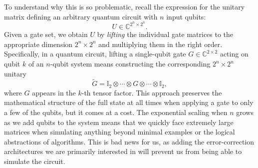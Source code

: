To understand why this is so problematic, recall the expression for the unitary matrix defining an arbitrary quantum circuit with $n$ input qubits:
\[U \in \mathbb{C}^{2^n \times 2^n}.\]
Given a gate set, we obtain $U$ by \emph{lifting} the individual gate matrices to the appropriate dimension $2^n \times 2^n$ and multiplying them in the right order. Specifically, in a quantum circuit, lifting a single-qubit gate $G \in \mathbb{C}^{2 \times 2}$ acting on qubit $k$ of an $n$-qubit system means constructing the corresponding $2^n \times 2^n$ unitary
\[
\tilde{G} = \mathbb{I}_2 \otimes \cdots \otimes G \otimes \cdots \otimes \mathbb{I}_2,
\]
where $G$ appears in the $k$-th tensor factor. This approach preserves the mathematical structure of the full state at all times when applying a gate to only a few of the qubits, but it comes at a cost. The exponential scaling when $n$ grows as we add qubits to the system means that we quickly face extremely large matrices when simulating anything beyond minimal examples or the logical abstractions of algorithms. This is bad news for us, as adding the error-correction architectures we are primarily interested in will prevent us from being able to simulate the circuit.

